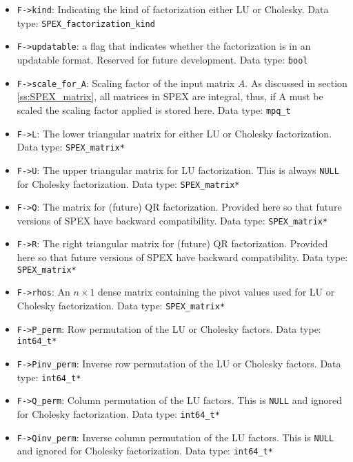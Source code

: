 \documentclass[12pt,oneside]{book}
\theoremstyle{definition}
\begin{document}
\begin{itemize}
\item \verb|F->kind|: Indicating the kind of factorization either LU or Cholesky. Data type: \verb|SPEX_factorization_kind|

\item \verb|F->updatable|: a flag that indicates whether the factorization is in an updatable format. Reserved for future development. Data type: \verb|bool|

\item \verb|F->scale_for_A|: Scaling factor of the input matrix $A$. As discussed in section \ref{ss:SPEX_matrix}, all matrices in SPEX are integral, thus, if A must be scaled the scaling factor applied is stored here. Data type: \verb|mpq_t|

\item \verb|F->L|: The lower triangular matrix for either LU or Cholesky factorization. Data type: \verb|SPEX_matrix*|

\item \verb|F->U|: The upper triangular matrix for LU factorization. This is always \verb|NULL| for Cholesky factorization. Data type: \verb|SPEX_matrix*|

\item \verb|F->Q|: The matrix for (future) QR factorization. Provided here so that future versions of SPEX have backward compatibility. Data type: \verb|SPEX_matrix*|

\item \verb|F->R|: The right triangular matrix for (future) QR factorization. Provided here so that future versions of SPEX have backward compatibility. Data type: \verb|SPEX_matrix*|

\item \verb|F->rhos|: An $n \times 1$ dense matrix containing the pivot values used for LU or Cholesky factorization. Data type: \verb|SPEX_matrix*|

\item \verb|F->P_perm|: Row permutation of the LU or Cholesky factors. Data type: \verb|int64_t*|

\item \verb|F->Pinv_perm|: Inverse row permutation of the LU or Cholesky factors. Data type: \verb|int64_t*|

\item \verb|F->Q_perm|: Column permutation of the LU factors. This is \verb|NULL| and ignored for Cholesky factorization. Data type: \verb|int64_t*|

\item \verb|F->Qinv_perm|: Inverse column permutation of the LU factors. This is \verb|NULL| and ignored for Cholesky factorization. Data type: \verb|int64_t*|
\end{itemize}
\end{document}
